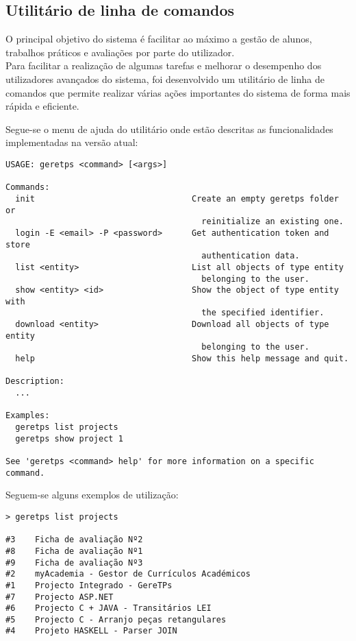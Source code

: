 \subsection{Utilitário de linha de comandos}

O principal objetivo do sistema é facilitar ao máximo a gestão de alunos, trabalhos práticos e avaliações por parte do utilizador. \\

Para facilitar a realização de algumas tarefas e melhorar o desempenho dos utilizadores avançados do sistema, foi desenvolvido um utilitário de linha de comandos que permite realizar várias ações importantes do sistema de forma mais rápida e eficiente.

Segue-se o menu de ajuda do utilitário onde estão descritas as funcionalidades implementadas na versão atual:

\begin{verbatim}
USAGE: geretps <command> [<args>]

Commands:
  init                                Create an empty geretps folder or 
                                        reinitialize an existing one.
  login -E <email> -P <password>      Get authentication token and store 
                                        authentication data.
  list <entity>                       List all objects of type entity 
                                        belonging to the user.
  show <entity> <id>                  Show the object of type entity with 
                                        the specified identifier.
  download <entity>                   Download all objects of type entity 
                                        belonging to the user.
  help                                Show this help message and quit.

Description:
  ...

Examples:
  geretps list projects
  geretps show project 1

See 'geretps <command> help' for more information on a specific command.
\end{verbatim}

Seguem-se alguns exemplos de utilização:

\begin{verbatim}
> geretps list projects

#3    Ficha de avaliação Nº2
#8    Ficha de avaliação Nº1
#9    Ficha de avaliação Nº3
#2    myAcademia - Gestor de Currículos Académicos
#1    Projecto Integrado - GereTPs
#7    Projecto ASP.NET
#6    Projecto C + JAVA - Transitários LEI
#5    Projecto C - Arranjo peças retangulares
#4    Projeto HASKELL - Parser JOIN
\end{verbatim}


